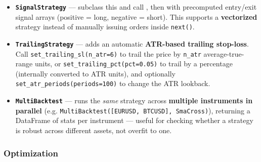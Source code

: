 \documentclass[12pt,openany]{book}
\theoremstyle{definition}
\theoremstyle{remark}
\begin{document}
\begin{itemize}
\item 
\textbf{\texttt{SignalStrategy}} — subclass this and call
, then
 with precomputed
entry/exit signal arrays (positive = long, negative = short). This supports a
\textbf{vectorized} strategy instead of manually issuing orders inside
\texttt{next()}.

\item 
\textbf{\texttt{TrailingStrategy}} — adds an automatic \textbf{ATR-based trailing stop-loss}. Call \texttt{set\_trailing\_sl(n\_atr=6)} to trail the price by \texttt{n\_atr} average-true-range units, or \texttt{set\_trailing\_pct(pct=0.05)} to trail by a percentage (internally converted to ATR units), and optionally \texttt{set\_atr\_periods(periods=100)} to change the ATR lookback.

\item 
\textbf{\texttt{MultiBacktest}} — runs the \emph{same} strategy across \textbf{multiple instruments in parallel} (e.g. \texttt{MultiBacktest([EURUSD, BTCUSD], SmaCross)}), returning a DataFrame of stats per instrument — useful for checking whether a strategy is robust across different assets, not overfit to one.

\end{itemize}
\subsubsection{Optimization}

\end{document}
